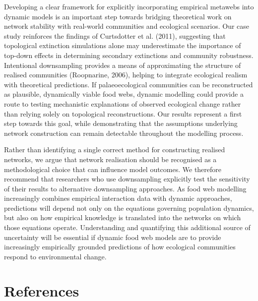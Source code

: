 \documentclass[
]{article}
\begin{document}
Developing a clear framework for explicitly incorporating empirical
metawebs into dynamic models is an important step towards bridging
theoretical work on network stability with real-world communities and
ecological scenarios. Our case study reinforces the findings of
Curtsdotter et al. (2011), suggesting that topological extinction
simulations alone may underestimate the importance of top-down effects
in determining secondary extinctions and community robustness.
Intentional downsampling provides a means of approximating the structure
of realised communities (Roopnarine, 2006), helping to integrate
ecological realism with theoretical predictions. If palaeoecological
communities can be reconstructed as plausible, dynamically viable food
webs, dynamic modelling could provide a route to testing mechanistic
explanations of observed ecological change rather than relying solely on
topological reconstructions. Our results represent a first step towards
this goal, while demonstrating that the assumptions underlying network
construction can remain detectable throughout the modelling process.

Rather than identifying a single correct method for constructing
realised networks, we argue that network realisation should be
recognised as a methodological choice that can influence model outcomes.
We therefore recommend that researchers who use downsampling explicitly
test the sensitivity of their results to alternative downsampling
approaches. As food web modelling increasingly combines empirical
interaction data with dynamic approaches, predictions will depend not
only on the equations governing population dynamics, but also on how
empirical knowledge is translated into the networks on which those
equations operate. Understanding and quantifying this additional source
of uncertainty will be essential if dynamic food web models are to
provide increasingly empirically grounded predictions of how ecological
communities respond to environmental change.

\section*{References}\label{references}
\end{document}
